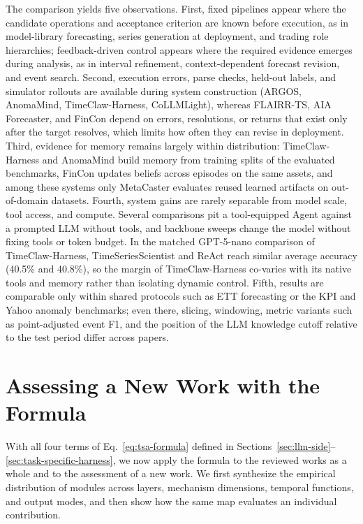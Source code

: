 \documentclass[preprints,article,submit,moreauthors]{Definitions/mdpi}
\begin{document}
The comparison yields five observations. First, fixed pipelines appear where the candidate operations and acceptance criterion are known before execution, as in model-library forecasting, series generation at deployment, and trading role hierarchies; feedback-driven control appears where the required evidence emerges during analysis, as in interval refinement, context-dependent forecast revision, and event search. Second, execution errors, parse checks, held-out labels, and simulator rollouts are available during system construction (ARGOS, AnomaMind, TimeClaw-Harness, CoLLMLight), whereas FLAIRR-TS, AIA Forecaster, and FinCon depend on errors, resolutions, or returns that exist only after the target resolves, which limits how often they can revise in deployment. Third, evidence for memory remains largely within distribution: TimeClaw-Harness and AnomaMind build memory from training splits of the evaluated benchmarks, FinCon updates beliefs across episodes on the same assets, and among these systems only MetaCaster evaluates reused learned artifacts on out-of-domain datasets. Fourth, system gains are rarely separable from model scale, tool access, and compute. Several comparisons pit a tool-equipped Agent against a prompted LLM without tools, and backbone sweeps change the model without fixing tools or token budget. In the matched GPT-5-nano comparison of TimeClaw-Harness, TimeSeriesScientist and ReAct reach similar average accuracy (40.5\% and 40.8\%), so the margin of TimeClaw-Harness co-varies with its native tools and memory rather than isolating dynamic control. Fifth, results are comparable only within shared protocols such as ETT forecasting or the KPI and Yahoo anomaly benchmarks; even there, slicing, windowing, metric variants such as point-adjusted event F1, and the position of the LLM knowledge cutoff relative to the test period differ across papers.

\section{Assessing a New Work with the Formula}
\label{sec:task-impact}


With all four terms of Eq.~\eqref{eq:tsa-formula} defined in Sections~\ref{sec:llm-side}--\ref{sec:task-specific-harness}, we now apply the formula to the reviewed works as a whole and to the assessment of a new work. We first synthesize the empirical distribution of modules across layers, mechanism dimensions, temporal functions, and output modes, and then show how the same map evaluates an individual contribution.
\end{document}
